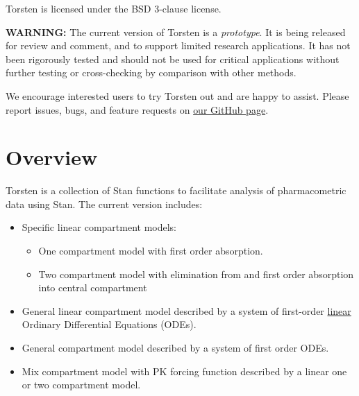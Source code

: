 \documentclass[11pt, reqno, oneside]{amsbook}
\numberwithin{equation}{chapter}
\numberwithin{figure}{chapter}
\numberwithin{table}{chapter}
\theoremstyle{remark}
\begin{document}
Torsten is licensed under the BSD 3-clause license.

\begin{mdframed}
\textbf{WARNING:} The current version of Torsten is a \emph{prototype}. It
is being released for review and comment, and to support limited
research applications. It has not been rigorously tested and should
not be used for critical applications without further testing or
cross-checking by comparison with other methods.

We encourage interested users to try Torsten out and are happy to
assist. Please report issues, bugs, and feature requests on
\href{https://github.com/metrumresearchgroup/stan}{our GitHub page}.
\end{mdframed}

\section{Overview}
\label{sec:orgde55eba}
Torsten is a collection of Stan functions to facilitate analysis of
pharmacometric data using Stan. The current version
includes:
\begin{itemize}
\item Specific linear compartment models:
\begin{itemize}
\item One compartment model with first order absorption.
\item Two compartment model with elimination from and first order absorption into central compartment
\end{itemize}
\item General linear compartment model described by a system of first-order \underline{linear} Ordinary Differential Equations (ODEs).
\item General compartment model described by a system of first order ODEs.
\item Mix compartment model with PK forcing function described by a linear one or two compartment model.
\end{itemize}
\end{document}
